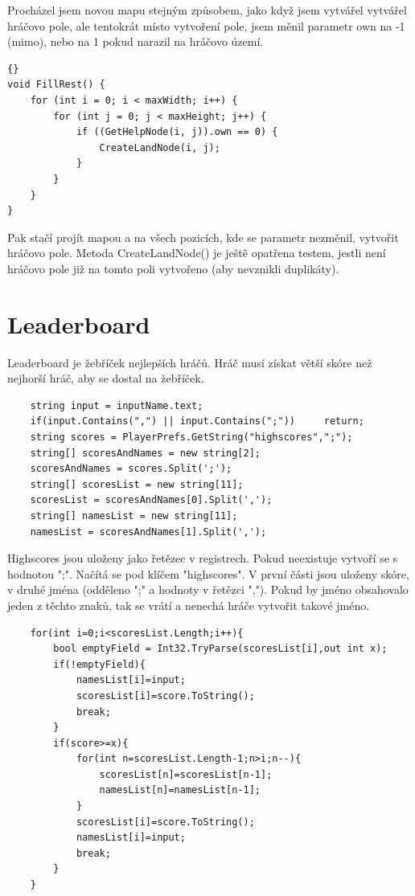 \documentclass[12pt,a4paper]{report}
\begin{document}
Procházel jsem novou mapu stejným způsobem, jako když jsem vytvářel vytvářel hráčovo pole,
ale tentokrát místo vytvoření pole, jsem měnil parametr own na -1 (mimo), nebo na 1 pokud narazil na hráčovo území.
\begin{lstlisting}[]{}
void FillRest() {
    for (int i = 0; i < maxWidth; i++) {
        for (int j = 0; j < maxHeight; j++) {
            if ((GetHelpNode(i, j)).own == 0) {
                CreateLandNode(i, j);
            }
        }
    }
}
\end{lstlisting}
Pak stačí projít mapou a na všech pozicích, kde se parametr nezměnil, vytvořit hráčovo pole.
Metoda CreateLandNode() je ještě opatřena testem, jestli není hráčovo pole již na tomto poli vytvořeno (aby nevznikli duplikáty).
\section{Leaderboard}
Leaderboard je žebříček nejlepších hráčů. Hráč musí získat větší skóre než nejhorší hráč, aby se dostal na žebříček.
\begin{lstlisting}
    string input = inputName.text;
    if(input.Contains(",") || input.Contains(";"))     return;
    string scores = PlayerPrefs.GetString("highscores",";");
    string[] scoresAndNames = new string[2];
    scoresAndNames = scores.Split(';');
    string[] scoresList = new string[11];
    scoresList = scoresAndNames[0].Split(',');
    string[] namesList = new string[11];
    namesList = scoresAndNames[1].Split(',');
\end{lstlisting}
Highscores jsou uloženy jako řetězec v registrech. Pokud neexistuje vytvoří se s hodnotou ";".
Načítá se pod klíčem "highscores". 
V první části jsou uloženy skóre, v druhé jména (odděleno ";" a hodnoty v řetězci ",").
Pokud by jméno obsahovalo jeden z těchto znaků, tak se vrátí a nenechá hráče vytvořit takové jméno.
\newpage
\begin{lstlisting}  
    for(int i=0;i<scoresList.Length;i++){
        bool emptyField = Int32.TryParse(scoresList[i],out int x);
        if(!emptyField){
            namesList[i]=input;                
            scoresList[i]=score.ToString();
            break;
        }
        if(score>=x){
            for(int n=scoresList.Length-1;n>i;n--){
                scoresList[n]=scoresList[n-1];
                namesList[n]=namesList[n-1];    
            }
            scoresList[i]=score.ToString();
            namesList[i]=input;
            break;
        }
    }
\end{lstlisting}
\end{document}
